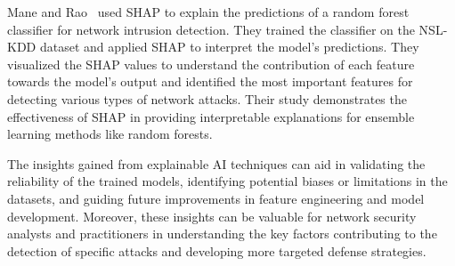 Mane and Rao~\cite{mane2021explaining} used SHAP to explain the predictions of a random forest classifier for network intrusion detection. They trained the classifier on the NSL-KDD dataset and applied SHAP to interpret the model's predictions. They visualized the SHAP values to understand the contribution of each feature towards the model's output and identified the most important features for detecting various types of network attacks. Their study demonstrates the effectiveness of SHAP in providing interpretable explanations for ensemble learning methods like random forests.

The insights gained from explainable AI techniques can aid in validating the reliability of the trained models, identifying potential biases or limitations in the datasets, and guiding future improvements in feature engineering and model development. Moreover, these insights can be valuable for network security analysts and practitioners in understanding the key factors contributing to the detection of specific attacks and developing more targeted defense strategies.